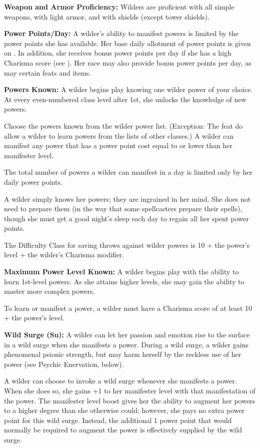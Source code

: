 \textbf{Weapon and Armor Proficiency:} Wilders are proficient with all simple weapons, with light armor, and with shields (except tower shields).

\textbf{Power Points/Day:} A wilder's ability to manifest powers is limited by the power points she has available. Her base daily allotment of power points is given on . In addition, she receives bonus power points per day if she has a high Charisma score (see ). Her race may also provide bonus power points per day, as may certain feats and items.

\textbf{Powers Known:} A wilder begins play knowing one wilder power of your choice. At every even-numbered class level after 1st, she unlocks the knowledge of new powers.

Choose the powers known from the wilder power list. (Exception: The feat  do allow a wilder to learn powers from the lists of other classes.) A wilder can manifest any power that has a power point cost equal to or lower than her manifester level.

The total number of powers a wilder can manifest in a day is limited only by her daily power points.

A wilder simply knows her powers; they are ingrained in her mind. She does not need to prepare them (in the way that some spellcasters prepare their spells), though she must get a good night's sleep each day to regain all her spent power points.

The Difficulty Class for saving throws against wilder powers is 10 + the power's level + the wilder's Charisma modifier.

\textbf{Maximum Power Level Known:} A wilder begins play with the ability to learn 1st-level powers. As she attains higher levels, she may gain the ability to master more complex powers.

To learn or manifest a power, a wilder must have a Charisma score of at least 10 + the power's level.

\textbf{Wild Surge (Su):} A wilder can let her passion and emotion rise to the surface in a wild surge when she manifests a power. During a wild surge, a wilder gains phenomenal psionic strength, but may harm herself by the reckless use of her power (see Psychic Enervation, below).

A wilder can choose to invoke a wild surge whenever she manifests a power. When she does so, she gains +1 to her manifester level with that manifestation of the power. The manifester level boost gives her the ability to augment her powers to a higher degree than she otherwise could; however, she pays no extra power point for this wild surge. Instead, the additional 1 power point that would normally be required to augment the power is effectively supplied by the wild surge.

